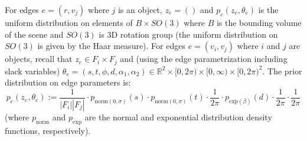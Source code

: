 For edges $e = (r, v_j)$ where $j$ is an object, $z_e = ()$ and $p_e(z_e, \theta_e)$ is the uniform distribution on elements of $B \times SO(3)$ where $B$ is the bounding volume of the scene and $SO(3)$ is 3D rotation group (the uniform distribution on $SO(3)$ is given by the Haar measure).
For edges $e = (v_i, v_j)$ where $i$ and $j$ are objects, recall that $z_e \in F_i \times F_j$ and (using the edge parametrization including slack variables) $\theta_e = (s, t, \phi, d, \alpha_1, \alpha_2) \in \mathbb{R}^2 \times [0, 2 \pi) \times [0, \infty) \times [0, 2 \pi)^2$.
The prior distribution on edge parameters is:
\begin{equation}
    p_e(z_e, \theta_e) := \frac{1}{|F_i| |F_j|}
    \cdot p_{\mathrm{norm}(0, \sigma)}(s) \cdot p_{\mathrm{norm}(0, \sigma)}(t)
    \cdot \frac{1}{2 \pi}
    \cdot p_{\mathrm{exp}(\beta)}(d)
    \cdot \frac{1}{2 \pi}
    \cdot \frac{1}{2 \pi}
\end{equation}
(where $p_{\mathrm{norm}}$ and $p_{\mathrm{exp}}$ are the normal and exponential distribution density functions, respectively).

